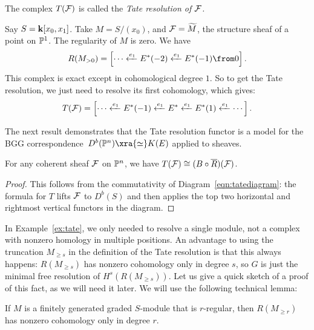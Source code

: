 \documentclass{amsart}
\begin{document}
\begin{defn}
The complex $T(\mathcal{F})$ is called the \emph{Tate resolution of $\mathcal{F}$.}
\end{defn}

\begin{example}
\label{ex:tate}
Say $S = \mathbf{k}[x_0, x_1]$. Take $M = S / (x_0)$, and $\mathcal{F} = \widetilde{M}$, the structure sheaf of a point on $\mathbb P^1$. The regularity of $M$ is zero. We have
$$
R(M_{> 0}) = \left[ \cdots \xla{e_1} E^*(-2) \xla{e_1} E^*(-1) \from 0 \right].
$$
This complex is exact except in cohomological degree $1$. So to get the Tate resolution, we just need to resolve its first cohomology, which gives:
$$
T(\mathcal{F}) = \left[
\cdots  \xleftarrow{e_1} E^*(-1) \xleftarrow{e_1} E^* \xleftarrow{e_1} E^*(1) \xleftarrow{e_1} \cdots
\right].
$$
\end{example}


The next result demonstrates that the Tate resolution functor is a model for the BGG correspondence~$D^b(\PP^n) \xra{\simeq} K(E)$ applied to sheaves.


\begin{prop}
\label{prop:tateBR}
For any coherent sheaf $\mathcal{F}$ on $\mathbb P^n$, we have $T(\mathcal{F}) \cong (B \circ \overline{R})(\mathcal{F})$. %
\end{prop}


\begin{proof}
This follows from the commutativity of Diagram~\eqref{eqn:tatediagram}: the formula for $T$ lifts $\mathcal{F}$ to $D^b(S)$ and then applies the top two horizontal and rightmost vertical functors in the diagram.
\end{proof}

In Example~\ref{ex:tate}, we only needed to resolve a single module, not a complex with nonzero homology in multiple positions. An advantage to using the truncation $M_{\ge s}$ in the definition of the Tate resolution is that this always happens: $R(M_{\ge s})$ has nonzero cohomology only in degree $s$,
so $G$ is just the minimal free resolution of $H^{s}(R(M_{\ge s}))$. Let us give a quick sketch of a proof of this fact, as we will need it later. We will use the following technical lemma:



\begin{prop}
If $M$ is a finitely generated graded $S$-module that is $r$-regular, then $R(M_{\ge r})$ has nonzero cohomology only in degree $r$.
\end{prop}
\end{document}
